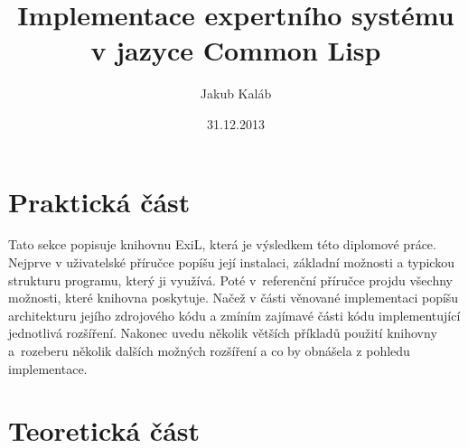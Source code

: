 \documentclass[12pt]{article}
\title{Implementace expertního systému v jazyce Common Lisp}
\author{Jakub Kaláb}
\date{31.12.2013}
\begin{document}
\maketitle
\renewcommand\listoflistingscaption{Seznam ukázek kódu}
\renewcommand\listingscaption{Ukázka kódu}
\listoflistings
{}

\nocite{introduction}
\nocite{paradigms}
\nocite{doorenbos}
\nocite{practical}
\nocite{clips}
\nocite{clhs}
\nocite{expert-system}
\nocite{rete}

\clearpage


\clearpage
\section{Praktická část}
Tato sekce popisuje knihovnu ExiL\footnotemark, která je výsledkem této
diplomové práce. Nejprve v uživatelské příručce popíšu její instalaci,
základní možnosti a typickou strukturu programu, který ji využívá. Poté
v~referenční příručce projdu všechny možnosti, které knihovna poskytuje.
Načež v části věnované implementaci popíšu architekturu jejího zdrojového
kódu a zmíním zajímavé části kódu implementující jednotlivá rozšíření.
Nakonec uvedu několik větších příkladů použití knihovny a~rozeberu několik
dalších možných rozšíření a co by obnášela z pohledu implementace.


\clearpage
\section{Teoretická část}


\clearpage

% 

\end{document}

